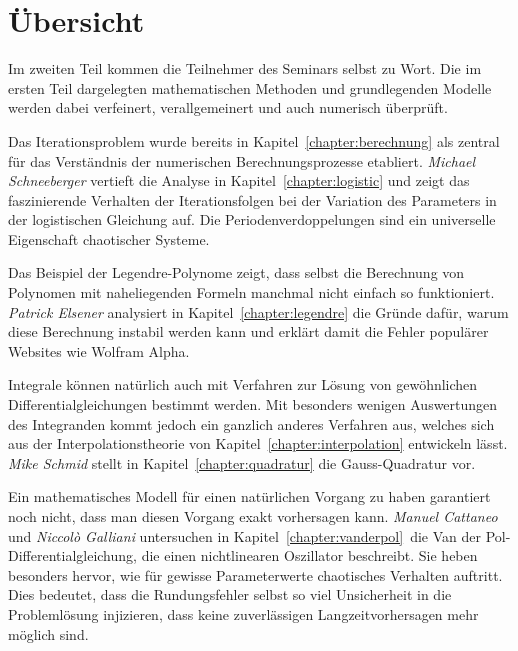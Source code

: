 %
%
%
\chapter*{Übersicht}
\rhead{}
\label{buch:uebersicht}
Im zweiten Teil kommen die Teilnehmer des Seminars selbst zu Wort.
Die im ersten Teil dargelegten mathematischen Methoden und
grundlegenden Modelle werden dabei verfeinert, verallgemeinert
und auch numerisch überprüft.

Das Iterationsproblem wurde bereits in Kapitel~\ref{chapter:berechnung}
als zentral für das Verständnis der numerischen Berechnungsprozesse
etabliert.
{\em Michael Schneeberger} vertieft die Analyse in
Kapitel~\ref{chapter:logistic}
und zeigt das faszinierende
Verhalten der Iterationsfolgen bei der Variation des Parameters in
der logistischen Gleichung auf.
Die Periodenverdoppelungen sind ein universelle Eigenschaft chaotischer
Systeme.

Das Beispiel der Legendre-Polynome zeigt, dass selbst die Berechnung
von Polynomen mit naheliegenden Formeln manchmal nicht einfach so 
funktioniert.
{\em Patrick Elsener} analysiert in Kapitel~\ref{chapter:legendre}
die Gründe dafür, warum diese 
Berechnung instabil werden kann und erklärt damit die Fehler 
populärer Websites wie Wolfram Alpha.

Integrale können natürlich auch mit Verfahren zur Lösung von
gewöhnlichen Differentialgleichungen bestimmt werden.
Mit besonders wenigen Auswertungen des Integranden kommt jedoch
ein ganzlich anderes Verfahren aus, welches sich aus der Interpolationstheorie
von Kapitel~\ref{chapter:interpolation} entwickeln lässt.
{\em Mike Schmid} stellt in Kapitel~\ref{chapter:quadratur} die
Gauss-Quadratur vor.

Ein mathematisches Modell für einen natürlichen Vorgang zu haben garantiert
noch nicht, dass man diesen Vorgang exakt vorhersagen kann.
{\em Manuel Cattaneo} und {\em Niccol\`o Galliani} untersuchen
in Kapitel~\ref{chapter:vanderpol} die
Van der Pol-Differentialgleichung, die einen nichtlinearen Oszillator
beschreibt.
Sie heben besonders hervor, wie für gewisse Parameterwerte chaotisches
Verhalten auftritt.
Dies bedeutet, dass die Rundungsfehler selbst so viel Unsicherheit in
die Problemlösung injizieren, dass keine zuverlässigen Langzeitvorhersagen 
mehr möglich sind.

